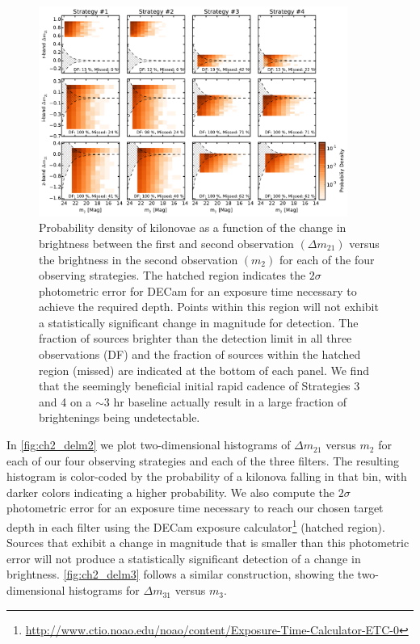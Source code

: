 \begin{figure}[t!]
\centering
\includegraphics[width=0.9\textwidth]{./figs/chapter2/ch2_f6.pdf}
\caption{Probability density of kilonovae as a function of the change in brightness between the first and second observation $(\Delta m_21)$ versus the brightness in the second observation $(m_2)$ for each of the four observing strategies. The hatched region indicates the $2\sigma$ photometric error for DECam for an exposure time necessary to achieve the required depth. Points within this region will not exhibit a statistically significant change in magnitude for detection. The fraction of sources brighter than the detection limit in all three observations (DF) and the fraction of sources within the hatched region (missed) are indicated at the bottom of each panel. We find that the seemingly beneficial initial rapid cadence of Strategies 3 and 4 on a $\sim$3 hr baseline actually result in a large fraction of brightenings being undetectable.}
\label{fig:ch2_delm2}
\end{figure}

In \autoref{fig:ch2_delm2} we plot two-dimensional histograms of $\Delta m_{21}$ versus $m_2$ for each of our four observing strategies and each of the three filters. The resulting histogram is color-coded by the probability of a kilonova falling in that bin, with darker colors indicating a higher probability. We also compute the $2\sigma$ photometric error for an exposure time necessary to reach our chosen target depth in each filter using the DECam exposure calculator\footnote{\url{http://www.ctio.noao.edu/noao/content/Exposure-Time-Calculator-ETC-0}} (hatched region). Sources that exhibit a change in magnitude that is smaller than this photometric error will not produce a statistically significant detection of a change in brightness. \autoref{fig:ch2_delm3} follows a similar construction, showing the two-dimensional histograms for $\Delta m_{31}$ versus $m_3$.

